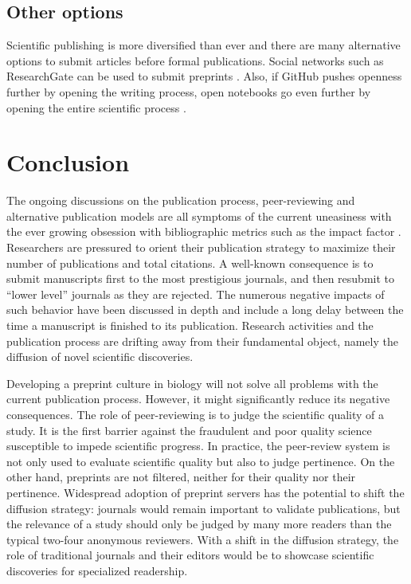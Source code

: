 \documentclass[10pt]{article}
\begin{document}
\subsection*{Other options}

Scientific publishing is more diversified than ever and there are many
alternative options to submit articles before formal publications. 
Social networks such as ResearchGate can be used to submit preprints
\cite{lin12}. Also, if GitHub pushes openness further by opening the writing process,
open notebooks go even further by opening the entire scientific process
\cite{san11}. 

\section*{Conclusion}

The ongoing discussions on the publication process, peer-reviewing and
alternative publication models are all symptoms of the current uneasiness
with the ever growing obsession with bibliographic metrics such as
the impact factor \cite{Fisher2012}. Researchers are pressured to orient
their publication strategy to maximize their number of publications and
total citations. A well-known consequence is to submit manuscripts first to the
most prestigious journals, and then resubmit to ``lower level'' journals as they
are rejected. The numerous negative impacts of such behavior have been discussed
in depth \cite{hoc09} and include a long delay between the time a manuscript is
finished to its publication. Research activities and the publication process
are drifting away from their fundamental object, namely the diffusion of novel
scientific discoveries. 

Developing a preprint culture in biology will not solve all problems with the
current publication process. However, it might significantly reduce its negative
consequences. The role of peer-reviewing is to judge the scientific quality of a
study. It is the first barrier against the fraudulent and poor quality science
susceptible to impede scientific progress. In practice, the peer-review system
is not only used to evaluate scientific quality but also to judge pertinence. On
the other hand, preprints are not filtered, neither for their quality nor their
pertinence. Widespread adoption of preprint servers has the potential to shift
the diffusion strategy: journals would remain important to validate
publications, but the relevance of a study should
only be judged by many more readers than the typical two-four anonymous
reviewers. With a shift in the diffusion strategy, the role of traditional
journals and their editors would be to showcase scientific discoveries for
specialized readership. 
\end{document}

